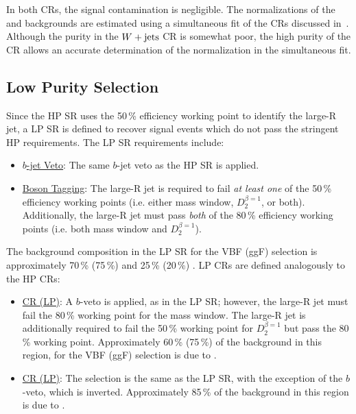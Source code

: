 In both CRs, the signal contamination is negligible. The normalizations of the \Wjets and \ttbar backgrounds are estimated using a simultaneous fit of the CRs discussed in~\Ch{\ref{ch:stats}}. Although the purity in the $W+\textrm{jets}$ CR is somewhat poor, the high purity of the \ttbar CR allows an accurate determination of the \Wjets normalization in the simultaneous fit. 

%
\subsection{Low Purity Selection}
\label{ch:evt_sel:lp}
Since the HP SR uses the 50\,\% efficiency working point to identify the large-R jet, a LP SR is defined to recover signal events which do not pass the stringent HP requirements. The LP SR requirements include:
\begin{itemize}
\item\underline{$b$-jet Veto}: The same $b$-jet veto as the HP SR is applied.
\item\underline{Boson Tagging}: The large-R jet is required to fail {\em at least one} of the 50\,\% efficiency working points (i.e. either mass window, $D_2^{\beta=1}$, or both). Additionally, the large-R jet must pass {\em both} of the 80\,\% efficiency working points (i.e. both mass window and $D_2^{\beta=1}$).
\end{itemize}
The background composition in the LP SR for the VBF (ggF) selection is approximately 70\,\% (75\,\%) \Wjets and 25\,\% (20\,\%) \ttbar. LP CRs are defined analogously to the HP CRs:
\begin{itemize}
\item\underline{\Wjets CR (LP)}: A $b$-veto is applied, as in the LP SR; however, the large-R jet must fail the 80\,\% working point for the mass window. The large-R jet is additionally required to fail the 50\,\% working point for $D_2^{\beta=1}$ but pass the 80\,\% working point. Approximately 60\,\% (75\,\%) of the background in this region, for the VBF (ggF) selection is due to \Wjets.
\item\underline{\ttbar CR (LP)}: The selection is the same as the LP SR, with the exception of the $b$-veto, which is inverted. Approximately 85\,\% of the background in this region is due to \ttbar.
\end{itemize}

